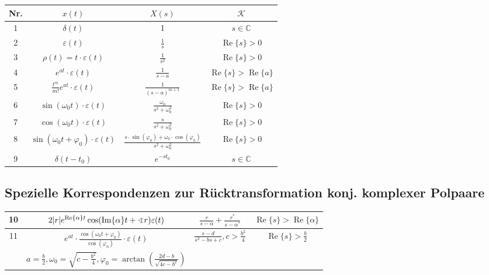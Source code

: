 \begin{tabular}{|c|c|c|c|}
\hline Nr. & $x(t)$ & $X(s)$ & $\mathcal{K}$ \\
\hline \hline 1 & $\delta(t)$ & 1 & $s \in \mathbb{C}$ \\
\hline 2 & $\varepsilon(t)$ & $\frac{1}{s}$ & $\operatorname{Re}\{s\}>0$ \\
\hline 3 & $\rho(t)=t \cdot \varepsilon(t)$ & $\frac{1}{s^{2}}$ & $\operatorname{Re}\{s\}>0$ \\
\hline 4 & $e^{a t} \cdot \varepsilon(t)$ & $\frac{1}{s-a}$ & $\operatorname{Re}\{s\}>\operatorname{Re}\{a\}$ \\
\hline 5 & $\frac{t^{m}}{m !} e^{a t} \cdot \varepsilon(t)$ & $\frac{1}{(s-a)^{m+1}}$ & $\operatorname{Re}\{s\}>\operatorname{Re}\{a\}$ \\
\hline 6 & $\sin \left(\omega_{0} t\right) \cdot \varepsilon(t)$ & $\frac{\omega_{0}}{s^{2}+\omega_{0}^{2}}$ & $\operatorname{Re}\{s\}>0$ \\
\hline 7 & $\cos \left(\omega_{0} t\right) \cdot \varepsilon(t)$ & $\frac{s}{s^{2}+\omega_{0}^{2}}$ & $\operatorname{Re}\{s\}>0$ \\
\hline 8 & $\sin \left(\omega_{0} t+\varphi_{0}\right) \cdot \varepsilon(t)$ & $\frac{s \cdot \sin \left(\varphi_{0}\right)+\omega_{0} \cdot \cos \left(\varphi_{0}\right)}{s^{2}+\omega_{0}^{2}}$ & $\operatorname{Re}\{s\}>0$ \\
\hline 9 & $\delta\left(t-t_{0}\right)$ & $e^{-s t_{0}}$ & $s \in \mathbb{C}$ \\
\hline
\end{tabular}

\subsection{Spezielle Korrespondenzen zur Rücktransformation konj. komplexer Polpaare}

\begin{tabular}{|c|c|c|c|}
\hline 10 & $2|r| e^{\operatorname{Re}\{\alpha\} t} \cos (\operatorname{Im}\{\alpha\} t+\varangle r) \varepsilon(t)$ & $\frac{r}{s-\alpha}+\frac{r^{*}}{s-\alpha^{*}}$ & $\operatorname{Re}\{s\}>\operatorname{Re}\{\alpha\}$ \\
\hline 11 & $e^{a t} \cdot \frac{\cos \left(\omega_{0} t+\varphi_{0}\right)}{\cos \left(\varphi_{0}\right)} \cdot \varepsilon(t)$ & $\frac{s-d}{s^{2}-b s+c}, c>\frac{b^{2}}{4}$ & $\operatorname{Re}\{s\}>\frac{b}{2}$ \\
&$a=\frac{b}{2}, \omega_{0}=\sqrt{c-\frac{b^{2}}{4}}, \varphi_{0}=\arctan \left(\frac{2 d-b}{\sqrt{4 c-b^{2}}}\right)$ & \\
\hline
\end{tabular}



